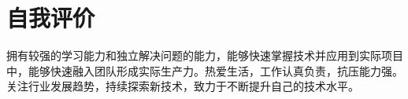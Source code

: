 \documentclass[11pt,a4paper]{article}
\begin{document}

	\section*{\textnormal{\textbf{自我评价}}}
	\noindent
	拥有较强的学习能力和独立解决问题的能力，能够快速掌握技术并应用到实际项目中，能够快速融入团队形成实际生产力。热爱生活，工作认真负责，抗压能力强。关注行业发展趋势，持续探索新技术，致力于不断提升自己的技术水平。
		
	\vfill
	\centering
\end{document}
